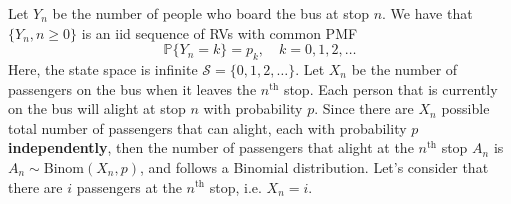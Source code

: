 \documentclass[12pt]{article}
\begin{document}
Let $Y_n$ be the number of people who board the bus at stop $n$. We have that $\{Y_n, n\geq 0\}$ is an iid sequence of RVs with common PMF \begin{equation}
    \mathbb{P}\{Y_n = k\} = p_k, \quad k = 0, 1, 2, \dots 
\end{equation} Here, the state space is infinite $\mathcal{S} = \{0, 1, 2, \dots\}$. Let $X_n$ be the number of passengers on the bus when it leaves the $n^{\text{th}}$ stop. Each person that is currently on the bus will alight at stop $n$ with probability $p$. Since there are $X_n$ possible total number of passengers that can alight, each with probability $p$ \textbf{independently}, then the number of passengers that alight at the $n^{\text{th}}$ stop $A_n$ is $A_n \sim \text{Binom}(X_{n}, p)$, and follows a Binomial distribution. Let's consider that there are $i$ passengers at the $n^{\text{th}}$ stop, i.e. $X_n = i$. \\ 
\end{document}
